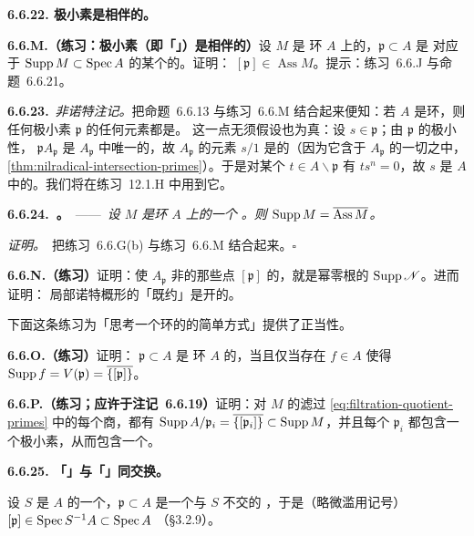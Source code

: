 \textbf{6.6.22. 极小素是相伴的。}

\textbf{6.6.M.（练习：极小素（即「\trIrreducibleComponent」）是相伴的）}\quad 设 $M$ 是%
\trNoetherian{}环 $A$ 上的\trFinitelyGenerated{}\trModule，$\mathfrak{p}\subset A$ 是
对应于 $\operatorname{Supp} M\subset\operatorname{Spec} A$ 的某个\trIrreducibleComponent{}的\trPrimeIdeal。证明：
$[\mathfrak{p}]\in\operatorname{Ass}M$。提示：练习~6.6.J 与命题~6.6.21。

\textbf{6.6.23.}\ \emph{非诺特注记。}\quad 把命题~6.6.13 与练习~6.6.M 结合起来便知：若
$A$ 是\trNoetherian{}环，则任何极小素 $\mathfrak{p}$ 的任何元素都是\trZerodivisor。
这一点无须\trNoetherian{}假设也为真：设 $s\in\mathfrak{p}$；由 $\mathfrak{p}$ 的极小性，
$\mathfrak{p}A_{\mathfrak{p}}$ 是 $A_{\mathfrak{p}}$ 中唯一的\trPrimeIdeal，故 $A_{\mathfrak{p}}$
的元素 $s/1$ 是\trNilpotent{}的（因为它含于 $A_{\mathfrak{p}}$ 的一切\trPrimeIdeal{}之中，
\cref{thm:nilradical-intersection-primes}）。于是对某个 $t\in A\smallsetminus\mathfrak{p}$
有 $ts^n=0$，故 $s$ 是 $A$ 中的\trZerodivisor。我们将在练习~12.1.H 中用到它。

\textbf{6.6.24.\ \trhProposition。}\ ——\ \emph{设 $M$ 是\trNoetherian{}环 $A$ 上的一个%
\trFinitelyGenerated{}\trModule。则 $\operatorname{Supp} M=\overline{\operatorname{Ass}M}$。}

\emph{证明。}\ 把练习~6.6.G(b) 与练习~6.6.M 结合起来。\hfill$\square$

\textbf{6.6.N.（练习）}\quad 证明：使 $A_{\mathfrak{p}}$ 非\trReduced{}的那些点
$[\mathfrak{p}]$ 的\trLocus，就是幂零根的\trSupport{} $\operatorname{Supp}\mathscr{N}$。进而证明：
局部诺特概形的「既约\trLocus」是开的。

下面这条练习为「思考一个环的\trAssociatedPrimeIdeal{}的简单方式」提供了正当性。

\textbf{6.6.O.（练习）}\quad 证明：\trPrimeIdeal{} $\mathfrak{p}\subset A$ 是\trNoetherian{}%
环 $A$ 的\trAssociatedPrimeIdeal{}，当且仅当存在 $f\in A$ 使得
$\operatorname{Supp} f=V(\mathfrak{p})=\overline{\{[\mathfrak{p}]\}}$。

\textbf{6.6.P.（练习；应许于注记~6.6.19）}\quad 证明：对 $M$ 的滤过%
\eqref{eq:filtration-quotient-primes} 中的每个商，都有
$\operatorname{Supp} A/\mathfrak{p}_i=\overline{\{[\mathfrak{p}_i]\}}\subset\operatorname{Supp} M$，并且每个
$\mathfrak{p}_i$ 都包含一个极小素，从而包含一个\trAssociatedPrimeIdeal{}。

\textbf{6.6.25. 「\trSupport」与「\trAssociatedPoint」同\trLocalization{}交换。}

设 $S$ 是 $A$ 的一个\trMultiplicativeSubset，$\mathfrak{p}\subset A$ 是一个与 $S$ 不交的%
\trPrimeIdeal，于是（略微滥用记号）$[\mathfrak{p}]\in\operatorname{Spec} S^{-1}A\subset\operatorname{Spec} A$
（\S3.2.9）。


